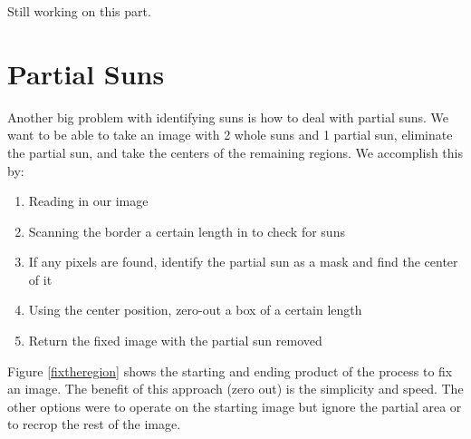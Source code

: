 \documentclass[10pt]{scrartcl}
\begin{document}
Still working on this part. 


\section{Partial Suns} %
\label{sec:partial_suns}
Another big problem with identifying suns is how to deal with partial suns. We want to be able to take an image with 2 whole suns and 1 partial sun, eliminate the partial sun, and take the centers of the remaining regions. We accomplish this by:

\begin{enumerate}
    \item Reading in our image
    \item Scanning the border a certain length in to check for suns
    \item If any pixels are found, identify the partial sun as a mask and find the center of it
    \item Using the center position, zero-out a box of a certain length
    \item Return the fixed image with the partial sun removed
\end{enumerate}

Figure \ref{fixtheregion} shows the starting and ending product of the process to fix an image. The benefit of this approach (zero out) is the simplicity and speed. The other options were to operate on the starting image but ignore the partial area or to recrop the rest of the image.
\end{document}
